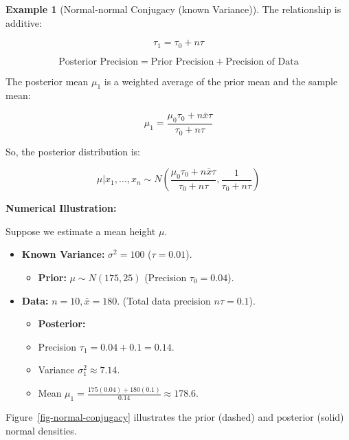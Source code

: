 \documentclass[
  letterpaper,
  DIV=11,
  numbers=noendperiod]{scrreprt}
\providecommand{\tightlist}{%
  \setlength{\itemsep}{0pt}\setlength{\parskip}{0pt}}
\renewcommand{\[}{\begin{equation}}
\renewcommand{\]}{\end{equation}}
\theoremstyle{definition}
\theoremstyle{plain}
\theoremstyle{plain}
\theoremstyle{plain}
\theoremstyle{definition}
\newtheorem{example}{Example}[chapter]
\theoremstyle{plain}
\theoremstyle{remark}
\begin{document}
\begin{example}[Normal-normal Conjugacy (known
Variance)]
The relationship is additive:

\[
\tau_1 = \tau_0 + n\tau
\]

\[
\text{Posterior Precision} = \text{Prior Precision} + \text{Precision of Data}
\]

The posterior mean \(\mu_1\) is a weighted average of the prior mean and
the sample mean:

\[
\mu_1 = \frac{\mu_0 \tau_0 + n\bar{x}\tau}{\tau_0 + n\tau}
\]

So, the posterior distribution is:

\[
\mu|x_1, \dots, x_n \sim N\left( \frac{\mu_0 \tau_0 + n\bar{x}\tau}{\tau_0 + n\tau}, \frac{1}{\tau_0 + n\tau} \right)
\]

\textbf{Numerical Illustration:}

Suppose we estimate a mean height \(\mu\).

\begin{itemize}
\tightlist
\item
  \textbf{Known Variance:} \(\sigma^2 = 100\) (\(\tau = 0.01\)).

  \begin{itemize}
  \tightlist
  \item
    \textbf{Prior:} \(\mu \sim N(175, 25)\) (Precision
    \(\tau_0 = 0.04\)).
  \end{itemize}
\item
  \textbf{Data:} \(n=10, \bar{x}=180\). (Total data precision
  \(n\tau = 0.1\)).

  \begin{itemize}
  \tightlist
  \item
    \textbf{Posterior:}
  \item
    Precision \(\tau_1 = 0.04 + 0.1 = 0.14\).
  \item
    Variance \(\sigma_1^2 \approx 7.14\).
  \item
    Mean \(\mu_1 = \frac{175(0.04) + 180(0.1)}{0.14} \approx 178.6\).
  \end{itemize}
\end{itemize}

Figure~\ref{fig-normal-conjugacy} illustrates the prior (dashed) and
posterior (solid) normal densities.

\end{example}
\end{document}
